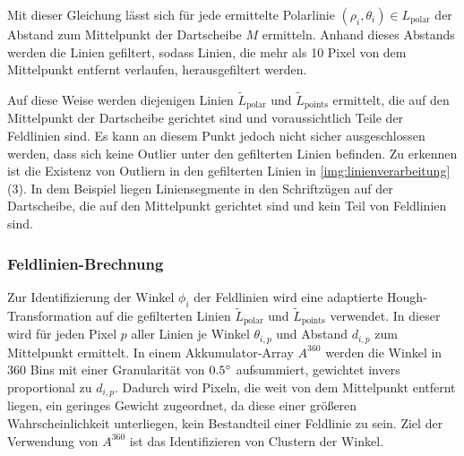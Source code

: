 Mit dieser Gleichung lässt sich für jede ermittelte Polarlinie $(\rho_i, \theta_i) \in L_\text{polar}$ der Abstand zum Mittelpunkt der Dartscheibe $M$ ermitteln. Anhand dieses Abstands werden die Linien gefiltert, sodass Linien, die mehr als 10 Pixel von dem Mittelpunkt entfernt verlaufen, herausgefiltert werden.

Auf diese Weise werden diejenigen Linien $\widetilde{L}_\text{polar}$ und $\widetilde{L}_\text{points}$ ermittelt, die auf den Mittelpunkt der Dartscheibe gerichtet sind und voraussichtlich Teile der Feldlinien sind. Es kann an diesem Punkt jedoch nicht sicher ausgeschlossen werden, dass sich keine Outlier unter den gefilterten Linien befinden. Zu erkennen ist die Existenz von Outliern in den gefilterten Linien in \autoref{img:linienverarbeitung} (3). In dem Beispiel liegen Liniensegmente in den Schriftzügen auf der Dartscheibe, die auf den Mittelpunkt gerichtet sind und kein Teil von Feldlinien sind.

\subsubsection{Feldlinien-Brechnung}
\label{sec:feldlinien_berechnung}

Zur Identifizierung der Winkel $\phi_i$ der Feldlinien wird eine adaptierte Hough-Transformation auf die gefilterten Linien $\widetilde{L}_\text{polar}$ und $\widetilde{L}_\text{points}$ verwendet. In dieser wird für jeden Pixel $p$ aller Linien je Winkel $\theta_{i, p}$ und Abstand $d_{i, p}$ zum Mittelpunkt ermittelt. In einem Akkumulator-Array $A^{360}$ werden die Winkel in 360 Bins mit einer Granularität von $0.5^{\circ}$ aufsummiert, gewichtet invers proportional zu $d_{i, p}$. Dadurch wird Pixeln, die weit von dem Mittelpunkt entfernt liegen, ein geringes Gewicht zugeordnet, da diese einer größeren Wahrscheinlichkeit unterliegen, kein Bestandteil einer Feldlinie zu sein. Ziel der Verwendung von $A^{360}$ ist das Identifizieren von Clustern der Winkel.

